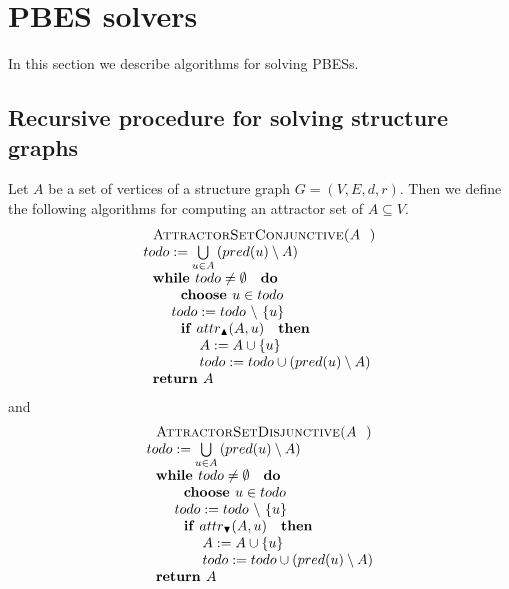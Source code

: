                       

\section{PBES solvers}

In this section we describe algorithms for solving PBESs.

\subsection{Recursive procedure for solving structure graphs}

Let $A$ be a set of vertices of a structure graph $G=(V,E,d,r)$. Then we
define the following algorithms for computing an attractor set of $%
A\subseteq V$.%
\begin{equation*}
\begin{array}{l}
\text{\textsc{AttractorSetConjunctive(}}A\text{\textsc{)}} \\ 
todo:=\bigcup\limits_{u\in A}\left( pred(u)\setminus A\right)  \\ 
\text{\textbf{while }}todo\neq \emptyset \text{ \textbf{do}} \\ 
\qquad \text{\textbf{choose }}u\in todo \\ 
\qquad todo:=todo\ \backslash \ \{u\} \\ 
\qquad \text{\textbf{if} }attr_{\blacktriangle }(A,u)\text{ \textbf{then}}
\\ 
\qquad \qquad A:=A\cup \{u\} \\ 
\qquad \qquad todo:=todo\cup \left( pred(u)\setminus A\right)  \\ 
\text{\textbf{return }}A%
\end{array}%
\end{equation*}%
and%
\begin{equation*}
\begin{array}{l}
\text{\textsc{AttractorSetDisjunctive(}}A\text{\textsc{)}} \\ 
todo:=\bigcup\limits_{u\in A}\left( pred(u)\setminus A\right)  \\ 
\text{\textbf{while }}todo\neq \emptyset \text{ \textbf{do}} \\ 
\qquad \text{\textbf{choose }}u\in todo \\ 
\qquad todo:=todo\ \backslash \ \{u\} \\ 
\qquad \text{\textbf{if} }attr_{\blacktriangledown }(A,u)\text{ \textbf{then}%
} \\ 
\qquad \qquad A:=A\cup \{u\} \\ 
\qquad \qquad todo:=todo\cup \left( pred(u)\setminus A\right)  \\ 
\text{\textbf{return }}A%
\end{array}%
\end{equation*}%
